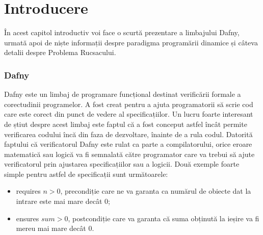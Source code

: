 \chapter*{Introducere} 

În acest capitol introductiv voi face o scurtă prezentare a limbajului Dafny, urmată apoi de niște informații despre paradigma programării dinamice și câteva detalii despre Problema Rucsacului.

\subsection*{Dafny}
Dafny este un limbaj de programare funcțional destinat verificării formale a corectudinii programelor. A fost creat pentru a ajuta programatorii să scrie cod care este corect din punct de vedere al specificațiilor. Un lucru foarte interesant de știut despre acest limbaj este faptul că a fost conceput astfel încât permite verificarea codului încă din faza de dezvoltare, înainte de a rula codul. Datorită faptului că verificatorul Dafny este rulat ca parte a compilatorului, orice eroare matematică sau logică va fi semnalată către programator care va trebui să ajute verificatorul prin ajustarea specificațiilor sau a logicii. Două exemple foarte simple pentru astfel de specificații sunt următoarele:
\begin{itemize}
    \item requires \( n > 0 \), precondiție care ne va garanta ca numărul de obiecte dat la intrare este mai mare decât 0;
    \item ensures \(sum >  0\), postcondiție care va garanta că suma obținută la ieșire va fi mereu mai mare decât 0.
\end{itemize}

